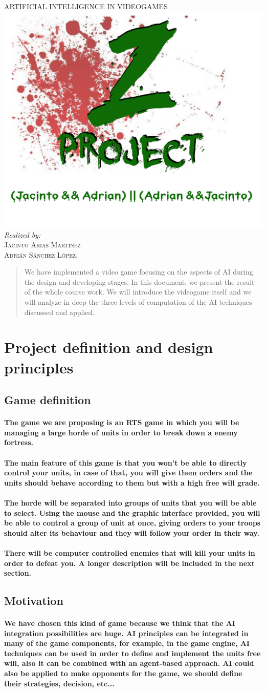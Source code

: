 \documentclass[a4paper,10pt]{article}
\newcommand{\titulo}[2]{ \begin{titlepage}\begin{center}\vspace*{\fill}\textsc{\Huge #1}\\[3cm]  \includegraphics[scale=0.3]{./zlogo.png} \\[3cm]\emph{Realized by:}\\ \textsc{Jacinto Arias Martínez}\\ \textsc{Adrián Sánchez López}\vspace*{\fill}\vfill\monthname[\the\month],\, \the\year\end{center}\end{titlepage}}
\newcommand{\p}[1]{\paragraph{\indent\textnormal{#1}}}
\begin{document}
 \titulo{ARTIFICIAL INTELLIGENCE IN VIDEOGAMES}{Practice project}

    \begin{abstract}
    We have implemented a video game focusing on the aspects of AI during the design and developing stages. In this document, we present the result of the whole course work. We will introduce the videogame itself and we will analyze in deep the three levels of computation of the AI techniques discussed and applied.
    \end{abstract}

  \newpage

  \vspace*{3cm}
  \tableofcontents
  \vspace*{\fill}

\newpage
\section{Project definition and design principles}

  \subsection{Game definition}

    \p{The game we are proposing is an \textbf{RTS} game in which you will be managing a large horde of units in order to break down a enemy fortress.}

    \p{The main feature of this game is that you won't be able to directly control your units, in case of that, you will give them orders and the units should behave according to them but with a high free will grade.}

    \p{The horde will be separated into groups of units that you will be able to select. Using the mouse and the graphic interface provided, you will be able to control a group of unit at once, giving orders to your troops should alter its behaviour and they will follow your order in their way.}

    \p{There will be computer controlled enemies that will kill your units in order to defeat you. A longer description will be included in the next section.}


  \subsection{Motivation}

    \p{We have chosen this kind of game because we think that the AI integration possibilities are huge. AI principles can be integrated in many of the game components, for example, in the game engine, AI techniques can be used in order to define and implement the units free will, also it can be combined with an agent-based approach. AI could also be applied to make opponents for the game, we should define their strategies, decision, etc...}
\end{document}
